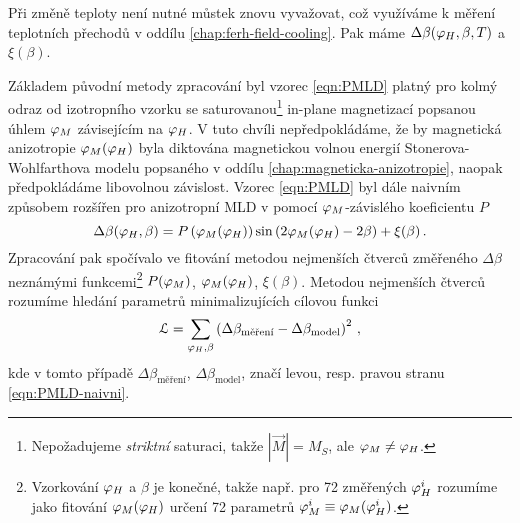 Při změně teploty není nutné můstek znovu vyvažovat, což využíváme k měření teplotních přechodů v oddílu \ref{chap:ferh-field-cooling}.
Pak máme $\Delta\beta(\varphi_H, \beta, T)$ a $\xi(\beta)$.

Základem původní metody zpracování byl vzorec \eqref{eqn:PMLD} platný pro kolmý odraz od izotropního vzorku se saturovanou\footnote{Nepožadujeme \emph{striktní} saturaci, takže $|\vec{M}|=M_S$, ale $\varphi_M\neq\varphi_H$.} in-plane magnetizací popsanou úhlem $\varphi_M$ závisejícím na $\varphi_H$.
V tuto chvíli nepředpokládáme, že by magnetická anizotropie $\varphi_M(\varphi_H)$ byla diktována magnetickou volnou energií Stonerova-Wohlfarthova modelu popsaného v oddílu \ref{chap:magneticka-anizotropie}, naopak předpokládáme libovolnou závislost.
Vzorec \eqref{eqn:PMLD} byl dále naivním způsobem rozšířen pro anizotropní MLD v \cite{wohlrathMagnetooptickaCharakterizaceSpintronickych2018} pomocí $\varphi_M$-závislého koeficientu $P$
\begin{equation}
\label{eqn:PMLD-naivni}
    \Delta\beta(\varphi_H, \beta)=P\left(\varphi_M(\varphi_H)\right) \sin\left(2\varphi_M(\varphi_H)-2\beta\right)+\xi(\beta) \,.
\end{equation}
Zpracování pak spočívalo ve fitování metodou nejmenších čtverců změřeného $\Delta\beta$ neznámými funkcemi\footnote{Vzorkování $\varphi_H$ a $\beta$ je konečné, takže např. pro 72 změřených $\varphi_H^i$ rozumíme jako fitování $\varphi_M(\varphi_H)$ určení 72 parametrů $\varphi_M^i\equiv\varphi_M(\varphi_H^i)$.} $P(\varphi_M)$, $\varphi_M(\varphi_H)$, $\xi(\beta)$.
Metodou nejmenších čtverců rozumíme hledání parametrů minimalizujících cílovou funkci
\begin{equation}
\label{eqn:L}
    \mathcal{L} = \sum_{\varphi_H, \beta} \left( \Delta\beta_\textrm{měření} - \Delta\beta_\textrm{model} \right)^2\,,
\end{equation}
kde v tomto případě $\Delta\beta_\textrm{měření}$, $\Delta\beta_\textrm{model}$, značí levou, resp. pravou stranu \eqref{eqn:PMLD-naivni}.

